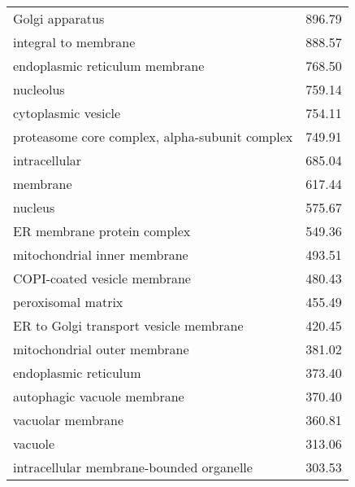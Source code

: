 \begin{table}[h]
\begin{center}
\begin{tabular}{@{}lr@{}}
Golgi apparatus                                              & 896.79                      \\
integral to membrane                                         & 888.57                      \\
endoplasmic reticulum membrane                               & 768.50                      \\
nucleolus                                                    & 759.14                      \\
cytoplasmic vesicle                                          & 754.11                      \\
proteasome core complex, alpha-subunit complex               & 749.91                      \\
intracellular                                                & 685.04                      \\
membrane                                                     & 617.44                      \\
nucleus                                                      & 575.67                      \\
ER membrane protein complex                                  & 549.36                      \\
mitochondrial inner membrane                                 & 493.51                      \\
COPI-coated vesicle membrane                                 & 480.43                      \\
peroxisomal matrix                                           & 455.49                      \\
ER to Golgi transport vesicle membrane                       & 420.45                      \\
mitochondrial outer membrane                                 & 381.02                      \\
endoplasmic reticulum                                        & 373.40                      \\
autophagic vacuole membrane                                  & 370.40                      \\
vacuolar membrane                                            & 360.81                      \\
vacuole                                                      & 313.06                      \\
intracellular membrane-bounded organelle                     & 303.53                      \\

\end{tabular}
\end{center}
\end{table}

